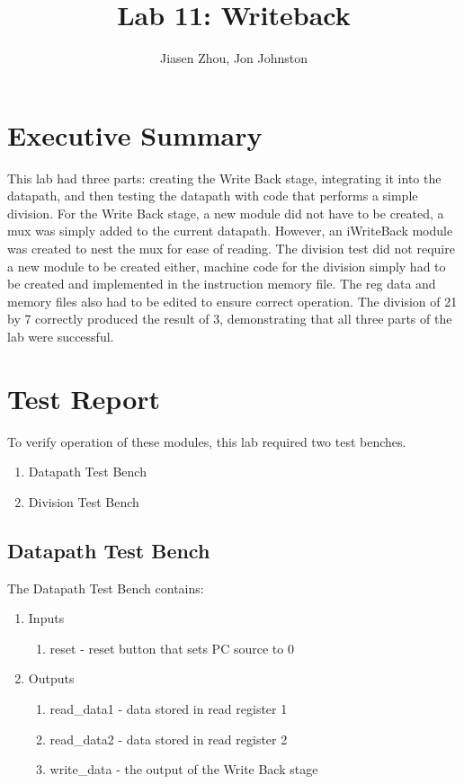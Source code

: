 \documentclass{article}
\author{Jiasen Zhou, Jon Johnston}
\title{Lab 11: Writeback}
\begin{document}
\maketitle

\section{Executive Summary}
This lab had three parts: creating the Write Back stage, integrating it into the datapath, and then testing the datapath with code that performs a simple division. For the Write Back stage, a new module did not have to be created, a mux was simply added to the current datapath. However, an iWriteBack module was created to nest the mux for ease of reading. The division test did not require a new module to be created either, machine code for the division simply had to be created and implemented in the instruction memory file. The reg data and memory files also had to be edited to ensure correct operation. The division of 21 by 7 correctly produced the result of 3, demonstrating that all three parts of the lab were successful.

\section{Test Report}
To verify operation of these modules, this lab required two test benches. 
\begin{enumerate}
	\item Datapath Test Bench
	\item Division Test Bench
\end{enumerate}

\subsection{Datapath Test Bench}
The Datapath Test Bench contains:
\begin{enumerate}
	\item Inputs
	\begin{enumerate}
		\item reset - reset button that sets PC source to 0
	\end{enumerate}	
	\item Outputs
	\begin{enumerate}	
		\item read\_data1 - data stored in read register 1
		\item read\_data2 - data stored in read register 2
		\item write\_data - the output of the Write Back stage 
	\end{enumerate}
\end{enumerate} 
\end{document}
